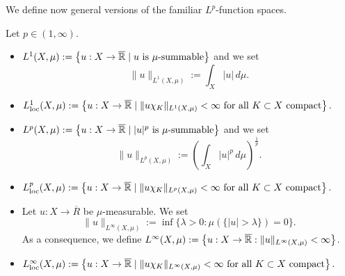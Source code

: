 
We define now general versions of the familiar $L^{p}$-function spaces.

\begin{definition} Let $p \in (1, \infty)$.
\begin{itemize}[]
\item $L^1(X,\mu) := \left\{ u: X \to \overline{\mathbb{R}} \mid \text{$u$ is
$\mu$-summable} \right\}$ and we set $$\|u\|_{L^{1}(X, \mu)} := \int_{X} |u| \, d \mu.$$
\item $L_{\textnormal{loc}}^1(X,\mu) := \left\{ u: X \to \overline{\mathbb{R}} \mid \|u\chi_K \|_{L^{1}(X, \mu)} < \infty \text{ for all $K\subset X$ compact} \right\}.$
\item $L^p(X,\mu) := \left\{ u: X \to \overline{\mathbb{R}} \mid \text{$|u|^p$ is
$\mu$-summable} \right\}$ and we set $$\|u\|_{L^{p}(X, \mu)} := \left ( \int_{X} |u|^p \, d \mu \right )^{\frac{1}{p}}.$$
\item $L_{\textnormal{loc}}^{p}(X,\mu) := \left\{ u: X \to \overline{\mathbb{R}} \mid \|u\chi_K \|_{L^{p}(X, \mu)} < \infty \text{ for all $K\subset X$ compact} \right\}.$
\item Let $u : X \to \overline{R}$ be $\mu$-measurable. We set $$\|u\|_{L^{\infty}(X, \mu)} := \inf \{ \lambda > 0 : \mu(\{ |u| > \lambda \}) = 0 \}.$$
As a consequence, we define $L^{\infty}(X, \mu) := \left \{ u: X \to \overline{\mathbb{R}} :  \|u\|_{L^{\infty}(X, \mu)} < \infty \right \}$.
\item $L^{\infty}_{\rm loc}(X,\mu) := \left\{ u: X \to \overline{\mathbb{R}} \mid \|u\chi_K \|_{L^{\infty}(X, \mu)} < \infty \text{ for all $K\subset X$ compact} \right\}.$
\end{itemize}
\end{definition}

